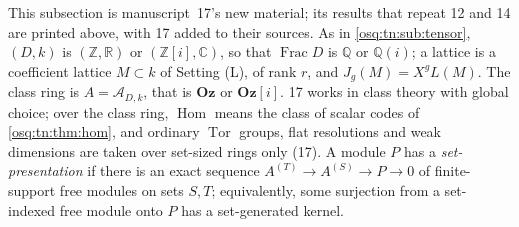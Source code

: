 \documentclass[11pt,letterpaper]{article}
\numberwithin{equation}{section}
\theoremstyle{definition}
\theoremstyle{remark}
\theoremstyle{plain}
\newcommand{\Oz}{\mathbf{Oz}}
\newcommand{\GOz}{\Oz[i]}
\newcommand{\Z}{\mathbb Z}
\newcommand{\Q}{\mathbb Q}
\newcommand{\R}{\mathbb R}
\newcommand{\C}{\mathbb C}
\newcommand{\A}{\mathcal A}          %
\newcommand{\Hom}{\operatorname{Hom}}
\newcommand{\Frac}{\operatorname{Frac}}
\newcommand{\Tor}{\operatorname{Tor}}
\begin{document}
This subsection is manuscript~17's new material; its results that repeat 12 and 14 are printed above, with 17 added to
their sources. As in \cref{osq:tn:sub:tensor}, $(D,k)$ is $(\Z,\R)$ or $(\Z[i],\C)$, so that $\Frac D$ is $\Q$ or $\Q(i)$; a
lattice is a coefficient lattice $M\subset k$ of Setting (L), of rank $r$, and $J_g(M)=X^gL(M)$. The class ring is $A=\A_{D,k}$,
that is $\Oz$ or $\GOz$. 17 works in class theory with global choice; over the class ring, $\Hom$ means the class of scalar codes
of \cref{osq:tn:thm:hom}, and ordinary $\Tor$ groups, flat resolutions and weak dimensions are taken over set-sized rings only
(17). A module $P$ has a \emph{set-presentation} if there is an exact sequence $A^{(T)}\to A^{(S)}\to P\to0$ of finite-support
free modules on sets $S,T$; equivalently, some surjection from a set-indexed free module onto $P$ has a set-generated kernel.
\end{document}
